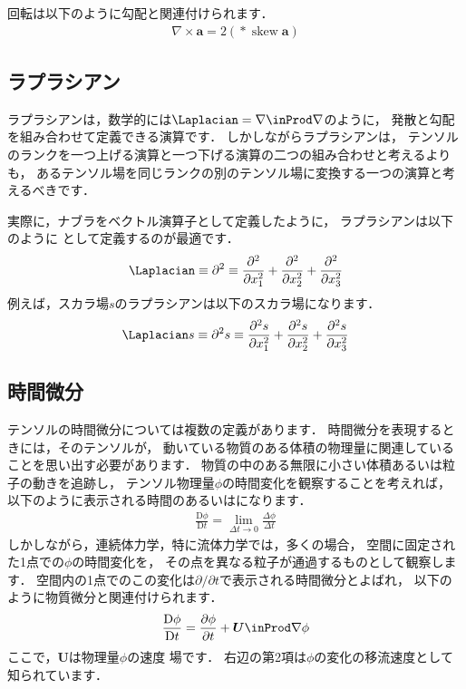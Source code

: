 回転は以下のように勾配と関連付けられます．
\begin{align}
 \label{eq:2.7}
 \nabla \times \bm{a} = 2(\mathop{*}\mathop{\mathrm{skew}}\bm{a})
\end{align}


\subsection{ラプラシアン}
\label{ssec:2.1.4}
ラプラシアンは，数学的には$\Laplacian = \nabla \inProd \nabla$のように，
発散と勾配を組み合わせて定義できる演算です．
しかしながらラプラシアンは，
テンソルのランクを一つ上げる演算と一つ下げる演算の二つの組み合わせと考えるよりも，
あるテンソル場を同じランクの別のテンソル場に変換する一つの演算と考えるべきです．

実際に，ナブラをベクトル演算子として定義したように，
ラプラシアンは以下のように
% 
として定義するのが最適です．
\begin{align}
 \label{eq:2.8}
 \Laplacian \equiv \partial^{2} \equiv
 \frac{\partial^{2}}{\partial x_{1}^{2}}
 + \frac{\partial^{2}}{\partial x_{2}^{2}}
 + \frac{\partial^{2}}{\partial x_{3}^{2}}
\end{align}
例えば，スカラ場$s$のラプラシアンは以下のスカラ場になります．
\begin{align}
 \label{eq:2.9}
 \Laplacian s \equiv \partial^{2}s \equiv
 \frac{\partial^{2}s}{\partial x_{1}^{2}}
 + \frac{\partial^{2}s}{\partial x_{2}^{2}}
 + \frac{\partial^{2}s}{\partial x_{3}^{2}}
\end{align}


\subsection{時間微分}
\label{ssec:2.1.5}
テンソルの時間微分については複数の定義があります．
時間微分を表現するときには，そのテンソルが，
動いている物質のある体積の物理量に関連していることを思い出す必要があります．
物質の中のある無限に小さい体積あるいは粒子の動きを追跡し，
テンソル物理量$\phi$の時間変化を観察することを考えれば，
以下のように表示される時間のあるいはになります．
\begin{align}
 \label{eq:2.10}
 \frac{\mathrm{D}\phi}{\mathrm{D}t} = \lim_{\Delta t \to 0}\frac{\Delta\phi}{\Delta t}
\end{align}
しかしながら，連続体力学，特に流体力学では，多くの場合，
空間に固定された1点での$\phi$の時間変化を，
その点を異なる粒子が通過するものとして観察します．
空間内の1点でのこの変化は$\partial / \partial t$で表示される時間微分とよばれ，
以下のように物質微分と関連付けられます．
\begin{align}
 \label{eq:2.11}
 \frac{\mathrm{D}\phi}{\mathrm{D}t}
 = \frac{\partial\phi}{\partial t} + \bm{U} \inProd \nabla\phi
\end{align}
ここで，$\bm{U}$は物理量$\phi$の速度
%
場です．
右辺の第2項は$\phi$の変化の移流速度として知られています．



